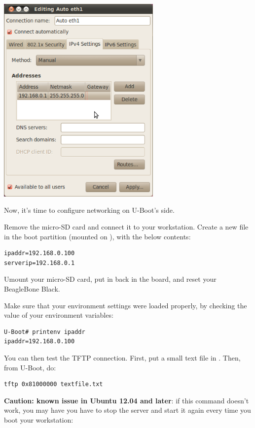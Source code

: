 \begin{center}
\includegraphics[width=8cm]{labs/kernel-board-setup/network-config-3.png}
\end{center}

Now, it's time to configure networking on U-Boot's side.

Remove the micro-SD card and connect it to your workstation. Create a
new  file in the boot partition (mounted on
), with the below contents:

\begin{verbatim}
ipaddr=192.168.0.100
serverip=192.168.0.1
\end{verbatim}

Umount your micro-SD card, put in back in the board, and reset your
BeagleBone Black.

Make sure that your environment settings were loaded properly, by
checking the value of your environment variables:

\begin{verbatim}
U-Boot# printenv ipaddr
ipaddr=192.168.0.100
\end{verbatim}

You can then test the TFTP connection.  First, put a small text
file in . Then, from U-Boot, do:

\begin{verbatim}
tftp 0x81000000 textfile.txt
\end{verbatim}

{\bf Caution: known issue in Ubuntu 12.04 and later}: if this command
doesn't work, you may have you have to stop the server and start it
again every time you boot your workstation:

